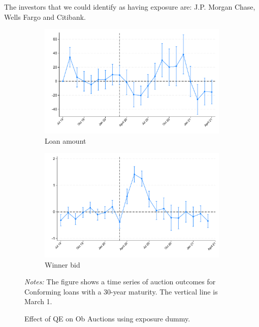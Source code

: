 \documentclass[11pt,a4paper]{article}
\begin{document}
The investors that we could identify as having exposure are: J.P. Morgan Chase, Wells Fargo and Citibank. 
\begin{figure}[h]
    \centering
    \begin{subfigure}[b]{0.49\textwidth}
        \includegraphics[width=0.998\textwidth]{../results/figures/did_loan_amount_exposure_march_dummy.pdf}
        \caption{ Loan amount }\label{fig:loan_amount}
       \end{subfigure}
       \begin{subfigure}[b]{0.49\textwidth}
        \includegraphics[width=0.998\textwidth]{../results/figures/did_winner_bid_exposure_march_dummy.pdf}
        \caption{ Winner bid }\label{fig:winner_bid}
       \end{subfigure}
       \caption{Effect of QE on Ob Auctions using exposure dummy.}\label{fig:did_exp_amount}
     \begin{minipage}{\textwidth}
        \footnotesize{\textit{Notes:} The figure shows a time series of auction outcomes for Conforming loans with a 30-year maturity. The vertical line is March 1.  } 
        \end{minipage}
  \end{figure}
  
\end{document}
